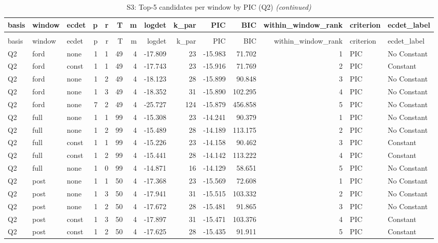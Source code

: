 \begingroup\fontsize{9}{11}\selectfont

\begin{longtable}[t]{lllrrrrrrrrrll}
\caption{\label{tab:tab:S3_pic_top5_Q2}S3: Top-5 candidates per window by PIC (Q2)}\\
\toprule
basis & window & ecdet & p & r & T & m & logdet & k\_par & PIC & BIC & within\_window\_rank & criterion & ecdet\_label\\
\midrule
\endfirsthead
\caption[]{S3: Top-5 candidates per window by PIC (Q2) \textit{(continued)}}\\
\toprule
basis & window & ecdet & p & r & T & m & logdet & k\_par & PIC & BIC & within\_window\_rank & criterion & ecdet\_label\\
\midrule
\endhead

\endfoot
\bottomrule
\endlastfoot
Q2 & ford & none & 1 & 1 & 49 & 4 & -17.809 & 23 & -15.983 & 71.702 & 1 & PIC & No Constant\\
Q2 & ford & const & 1 & 1 & 49 & 4 & -17.743 & 23 & -15.916 & 71.769 & 2 & PIC & Constant\\
Q2 & ford & none & 1 & 2 & 49 & 4 & -18.123 & 28 & -15.899 & 90.848 & 3 & PIC & No Constant\\
Q2 & ford & none & 1 & 3 & 49 & 4 & -18.352 & 31 & -15.890 & 102.295 & 4 & PIC & No Constant\\
Q2 & ford & none & 7 & 2 & 49 & 4 & -25.727 & 124 & -15.879 & 456.858 & 5 & PIC & No Constant\\
\addlinespace
Q2 & full & none & 1 & 1 & 99 & 4 & -15.308 & 23 & -14.241 & 90.379 & 1 & PIC & No Constant\\
Q2 & full & none & 1 & 2 & 99 & 4 & -15.489 & 28 & -14.189 & 113.175 & 2 & PIC & No Constant\\
Q2 & full & const & 1 & 1 & 99 & 4 & -15.226 & 23 & -14.158 & 90.462 & 3 & PIC & Constant\\
Q2 & full & const & 1 & 2 & 99 & 4 & -15.441 & 28 & -14.142 & 113.222 & 4 & PIC & Constant\\
Q2 & full & none & 1 & 0 & 99 & 4 & -14.871 & 16 & -14.129 & 58.651 & 5 & PIC & No Constant\\
\addlinespace
Q2 & post & none & 1 & 1 & 50 & 4 & -17.368 & 23 & -15.569 & 72.608 & 1 & PIC & No Constant\\
Q2 & post & none & 1 & 3 & 50 & 4 & -17.941 & 31 & -15.515 & 103.332 & 2 & PIC & No Constant\\
Q2 & post & none & 1 & 2 & 50 & 4 & -17.672 & 28 & -15.481 & 91.865 & 3 & PIC & No Constant\\
Q2 & post & const & 1 & 3 & 50 & 4 & -17.897 & 31 & -15.471 & 103.376 & 4 & PIC & Constant\\
Q2 & post & const & 1 & 2 & 50 & 4 & -17.625 & 28 & -15.435 & 91.911 & 5 & PIC & Constant\\*
\end{longtable}
\endgroup{}
